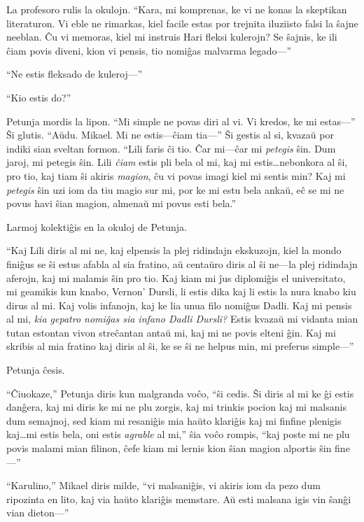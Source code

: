 La profesoro rulis la okulojn.
“Kara, mi komprenas, ke vi ne konas la skeptikan literaturon.
Vi eble ne rimarkas, kiel facile estas por trejnita iluziisto falsi la ŝajne neeblan.
Ĉu vi memoras, kiel mi instruis Hari fleksi kulerojn?
Se ŝajnis, ke ili ĉiam povis diveni, kion vi pensis, tio nomiĝas malvarma legado—”

“Ne estis fleksado de kuleroj—”

“Kio estis do?”

Petunja mordis la lipon.
“Mi simple ne povas diri al vi.
Vi kredos, ke mi estas—”
Ŝi glutis.
“Aŭdu.
Mikael.
Mi ne estis—ĉiam tia—”
Ŝi gestis al si, kvazaŭ por indiki sian sveltan formon.
“Lili faris ĉi tio.
Ĉar mi—ĉar mi \emph{petegis} ŝin.
Dum jaroj, mi petegis ŝin.
Lili \emph{ĉiam} estis pli bela ol mi, kaj mi estis…nebonkora al ŝi, pro tio, kaj tiam ŝi akiris \emph{magion}, ĉu vi povas imagi kiel mi sentis min?
Kaj mi \emph{petegis} ŝin uzi iom da tiu magio sur mi, por ke mi estu bela ankaŭ, eĉ se mi ne povus havi ŝian magion, almenaŭ mi povus esti bela.”

Larmoj kolektiĝis en la okuloj de Petunja.

“Kaj Lili diris al mi ne, kaj elpensis la plej ridindajn ekskuzojn, kiel la mondo finiĝus se ŝi estus afabla al sia fratino, aŭ centaŭro diris al ŝi ne—la plej ridindajn aferojn, kaj mi malamis ŝin pro tio.
Kaj kiam mi ĵus diplomiĝis el universitato, mi geamikis kun knabo, Vernon' Dursli, li estis dika kaj li estis la nura knabo kiu dirus al mi.
Kaj volis infanojn, kaj ke lia unua filo nomiĝus Dadli.
Kaj mi pensis al mi, \emph{kia gepatro nomiĝas sia infano Dadli Dursli?}
Estis kvazaŭ mi vidanta mian tutan estontan vivon streĉantan antaŭ mi, kaj mi ne povis elteni ĝin.
Kaj mi skribis al mia fratino kaj diris al ŝi, ke se ŝi ne helpus min, mi preferus simple—”

Petunja ĉesis.

“Ĉiuokaze,” Petunja diris kun malgranda voĉo, “ŝi cedis.
Ŝi diris al mi ke ĝi estis danĝera, kaj mi diris ke mi ne plu zorgis, kaj mi trinkis pocion kaj mi malsanis dum semajnoj, sed kiam mi resaniĝis mia haŭto klariĝis kaj mi finfine plenigis kaj…mi estis bela, oni estis \emph{agrable} al mi,” ŝia voĉo rompis, “kaj poste mi ne plu povis malami mian filinon, ĉefe kiam mi lernis kion ŝian magion alportis ŝin fine—”

“Karulino,” Mikael diris milde, “vi malsaniĝis, vi akiris iom da pezo dum ripozinta en lito, kaj via haŭto klariĝis memstare.
Aŭ esti malsana igis vin ŝanĝi vian dieton—”

